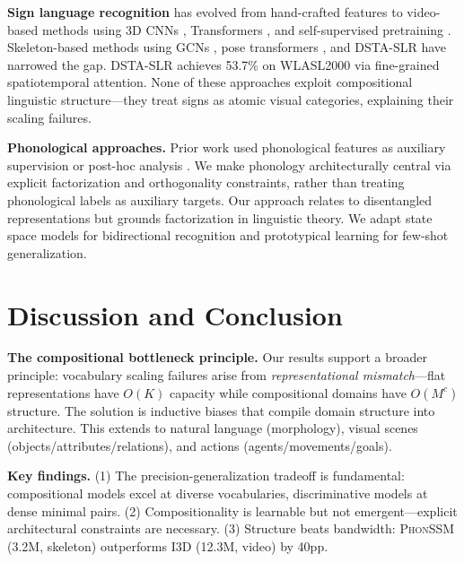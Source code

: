 \documentclass{article}
\theoremstyle{definition}
\theoremstyle{remark}
\newcommand{\phonssm}{\textsc{PhonSSM}}
\begin{document}
\textbf{Sign language recognition} has evolved from hand-crafted features \citep{cooper2011sign} to video-based methods using 3D CNNs \citep{carreira2017quo, feichtenhofer2019slowfast, lin2019tsm}, Transformers \citep{camgoz2020sign}, and self-supervised pretraining \citep{hu2021signbert}. Skeleton-based methods using GCNs \citep{yan2018spatial, li2020word, shi2019two, duan2022pyskl}, pose transformers \citep{bohacek2022spoter}, and DSTA-SLR \citep{hu2024dsta} have narrowed the gap. DSTA-SLR achieves 53.7\% on WLASL2000 via fine-grained spatiotemporal attention. None of these approaches exploit compositional linguistic structure---they treat signs as atomic visual categories, explaining their scaling failures.

\textbf{Phonological approaches.} Prior work used phonological features as auxiliary supervision \citep{koller2015continuous} or post-hoc analysis \citep{bragg2019sign}. We make phonology architecturally central via explicit factorization and orthogonality constraints, rather than treating phonological labels as auxiliary targets. Our approach relates to disentangled representations \citep{higgins2017beta} but grounds factorization in linguistic theory. We adapt state space models \citep{gu2022efficiently, gu2023mamba} for bidirectional recognition and prototypical learning \citep{snell2017prototypical} for few-shot generalization.

\section{Discussion and Conclusion}

\textbf{The compositional bottleneck principle.} Our results support a broader principle: vocabulary scaling failures arise from \textit{representational mismatch}---flat representations have $O(K)$ capacity while compositional domains have $O(M^c)$ structure. The solution is inductive biases that compile domain structure into architecture. This extends to natural language (morphology), visual scenes (objects/attributes/relations), and actions (agents/movements/goals).

\textbf{Key findings.} (1) The precision-generalization tradeoff is fundamental: compositional models excel at diverse vocabularies, discriminative models at dense minimal pairs. (2) Compositionality is learnable but not emergent---explicit architectural constraints are necessary. (3) Structure beats bandwidth: \phonssm{} (3.2M, skeleton) outperforms I3D (12.3M, video) by 40pp.
\end{document}
